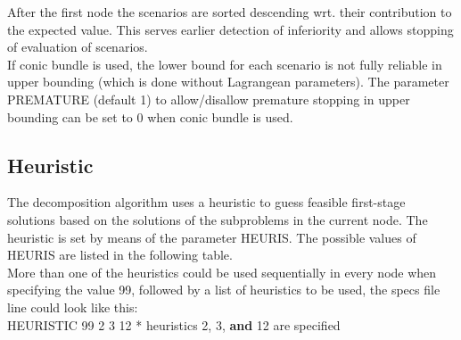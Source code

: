 \documentclass[11pt,draft]{article}
\newcommand{\+}{{\ti{+}}}
\newcommand{\1}{{\ti{1}}}
\begin{document}
After the first node the scenarios are sorted descending wrt. their contribution to the expected value. 
This serves earlier detection of inferiority and allows stopping of evaluation of scenarios.\\
If conic bundle is used, the lower bound for each scenario is not fully reliable in upper bounding (which is done without Lagrangean parameters).
The parameter PREMATURE (default 1) to allow/disallow premature stopping in upper bounding can be set to 0 when conic bundle is used.

\subsection{Heuristic}
The decomposition algorithm uses a heuristic to guess feasible first-stage solutions based on the
solutions of the subproblems in the current node. The heuristic is set by means of the parameter
HEURIS. The possible values of HEURIS are listed in the following table.\\
More than one of the heuristics could be used sequentially in every node when specifying the value 99, followed by a
list of heuristics to be used, the specs file line could look like this:\\[0.5em]
HEURISTIC  99 2 3 12 * heuristics 2, 3, {\bf and} 12 are specified
%
\end{document}
